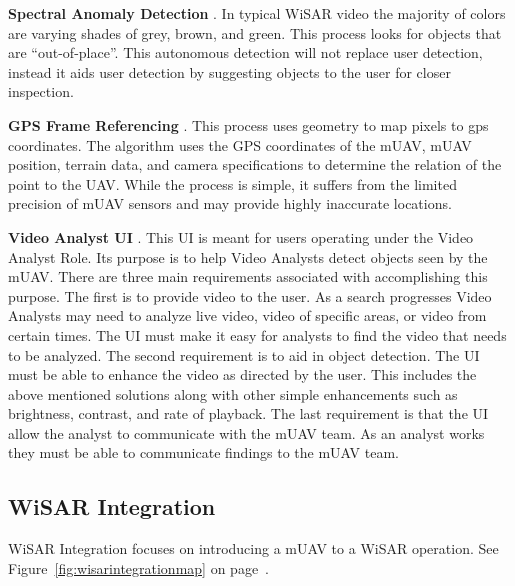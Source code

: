 \textbf{Spectral Anomaly Detection} \cite{thornton2011detection,
rasmussen2008enhancement}.  In typical WiSAR video the majority of colors are
varying shades of grey, brown, and green.  This process looks for objects that
are ``out-of-place''.  This autonomous detection will not replace user
detection, instead it aids user detection by suggesting objects to the user for
closer inspection.

\textbf{GPS Frame Referencing} \cite{morse2010coverage}.  This process uses
geometry to map pixels to gps coordinates.  The
algorithm uses the GPS coordinates of the mUAV, mUAV position, terrain data,
and camera specifications to determine the relation of the point to the UAV. 
While the process is simple, it suffers from the limited precision of mUAV
sensors and may provide highly inaccurate locations.

\textbf{Video Analyst UI} \cite{lin2010supporting}.  This UI is meant for users
operating under the Video Analyst Role.  Its purpose is to help Video
Analysts detect objects seen by the mUAV.  There are three main requirements
associated with accomplishing this purpose.  The first is to provide video to
the user.  As a search progresses Video Analysts may need to analyze live video,
video of specific areas, or video from certain times.  The UI must make it easy
for analysts to find the video that needs to be analyzed.  The second
requirement is to aid in object detection.  The UI must be able to enhance the
video as directed by the user.  This includes the above mentioned solutions
along with other simple enhancements such as brightness, contrast, and rate of
playback.  The last requirement is that the UI allow the analyst to communicate
with the mUAV team.  As an analyst works they must be able to communicate
findings to the mUAV team.

\subsection{WiSAR Integration}
WiSAR Integration focuses on introducing a mUAV to a
WiSAR operation.  See Figure~\ref{fig:wisarintegrationmap} on
page~\pageref{fig:wisarintegrationmap}.

